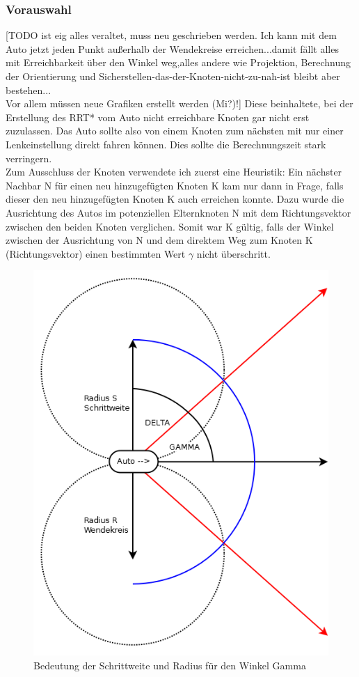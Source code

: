 \subsubsection{Vorauswahl}
\label{sec:Vorauswahl}
[TODO ist eig alles veraltet, muss neu geschrieben werden. Ich kann mit dem Auto jetzt jeden Punkt außerhalb der Wendekreise erreichen...damit fällt alles mit Erreichbarkeit über den Winkel weg,alles andere wie Projektion, Berechnung der Orientierung und Sicherstellen-das-der-Knoten-nicht-zu-nah-ist bleibt aber bestehen...\\
Vor allem müssen neue Grafiken erstellt werden (Mi?)!]
Diese beinhaltete, bei der Erstellung des RRT* vom Auto nicht erreichbare Knoten gar nicht erst zuzulassen. Das Auto sollte also von einem Knoten zum nächsten mit nur einer Lenkeinstellung direkt fahren können. Dies sollte die Berechnungszeit stark verringern. \\
Zum Ausschluss der Knoten verwendete ich zuerst eine Heuristik: Ein nächster Nachbar N für einen neu hinzugefügten Knoten K kam nur dann in Frage, falls dieser den neu hinzugefügten Knoten K auch erreichen konnte. Dazu wurde die Ausrichtung des Autos im potenziellen Elternknoten N mit dem Richtungsvektor zwischen den beiden Knoten verglichen. Somit war K gültig, falls der Winkel zwischen der Ausrichtung von N und dem direktem Weg zum Knoten K (Richtungsvektor) einen bestimmten Wert $\gamma$ nicht überschritt.
\begin{figure}
\centering
\label{fig:fig4}
\includegraphics[scale=0.6]{Bilder/AusrichtungGrob.png} 
\caption{Bedeutung der Schrittweite und Radius für den Winkel Gamma}
\end{figure}
